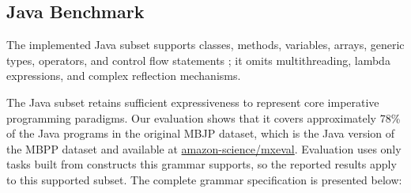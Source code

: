 \documentclass[manuscript,screen]{acmart}
\begin{document}
\subsection{Java Benchmark}
   {\color{revblue}The implemented Java subset supports } classes, methods, variables, arrays, generic types, operators, and control flow statements   {\color{revblue}; it omits } multithreading, lambda expressions, and complex reflection mechanisms.

The Java subset retains sufficient expressiveness to represent core imperative programming paradigms. Our evaluation shows that it covers approximately 78\% of the Java programs in the original MBJP dataset, which is the Java version of  {\color{revblue}the } MBPP dataset and available at \href{https://github.com/amazon-science/mxeval}{amazon-science/mxeval}.
 {\color{revblue}Evaluation uses only tasks built from constructs this grammar supports, so the reported results apply to this supported subset.
} The complete grammar specification is presented below:
\end{document}
